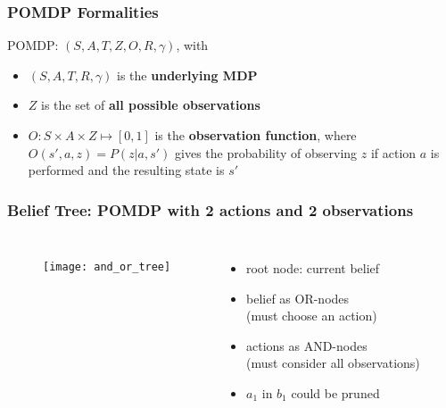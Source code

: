\begin{frame}
\frametitle{POMDP Formalities}
POMDP: $(S,A,T,Z,O,R,\gamma)$, with
\pause
\begin{itemize}
  \item $(S, A, T, R, \gamma)$ is the \textbf{underlying MDP} \pause
  \item $Z$ is the set of \textbf{all possible observations} \pause
  \item $O: S \times A \times Z \mapsto [0,1]$ is the \textbf{observation function}, where $O(s', a, z) = P(z|a, s')$
  gives the probability of observing $z$ if action $a$ is performed and the resulting state is $s'$
\end{itemize}
\end{frame}

\begin{frame}
\frametitle{Belief Tree: POMDP with 2 actions and 2 observations}
\begin{columns}
    \begin{figure}
        \centering
        \texttt{[image: and\_or\_tree]}
    \end{figure}
    \begin{itemize}
        \item root node: current belief
        \item belief as OR-nodes \\
            (must choose an action)
        \item actions as AND-nodes \\
            {\scriptsize(must consider all observations)}
        \item $a_1$ in $b_1$ could be pruned
        \end{itemize}
\end{columns}
\end{frame}

